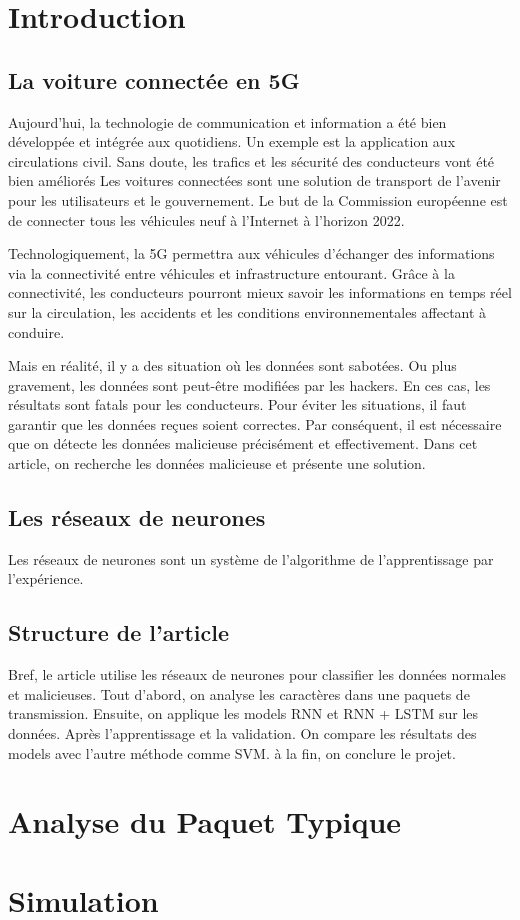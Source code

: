 \documentclass[a4paper]{report}
\begin{document}
\chapter{Introduction}	
	
\section{La voiture connectée en 5G}
Aujourd'hui, la technologie de communication et information a été bien développée et intégrée aux quotidiens. 
Un exemple est la application aux circulations civil. Sans doute, les trafics et les sécurité des conducteurs vont été bien améliorés
Les voitures connectées sont une solution de transport de l'avenir pour les utilisateurs et le gouvernement.  
Le but de la Commission européenne est de connecter tous les véhicules neuf à l'Internet à l'horizon 2022.


Technologiquement, la 5G permettra aux véhicules d'échanger des informations via la connectivité entre véhicules et infrastructure entourant.  
Grâce à la connectivité, les conducteurs pourront mieux savoir les informations en temps réel sur la circulation, les accidents et les conditions environnementales affectant à conduire. 

Mais en réalité, il y a des situation où les données sont sabotées. 
Ou plus gravement, les données sont peut-être modifiées par les hackers.
En ces cas, les résultats sont fatals pour les conducteurs. 
Pour éviter les situations, il faut garantir que les données reçues soient correctes.
Par conséquent, il est nécessaire que on détecte les données malicieuse précisément et effectivement. 
Dans cet article, on recherche les données malicieuse et présente une solution. 

\section{Les réseaux de neurones}
Les réseaux de neurones sont un système de l'algorithme de l'apprentissage par l'expérience.  

\section{Structure de l'article}
Bref, le article utilise les réseaux de neurones pour classifier les données normales et malicieuses.
Tout d'abord, on analyse les caractères dans une paquets de transmission.
Ensuite, on applique les models RNN et RNN + LSTM sur les données. 
Après l'apprentissage et la validation. On compare les résultats des models avec l'autre méthode comme SVM. 
à la fin, on conclure le projet.  

\chapter{Analyse du Paquet Typique}

\chapter{Simulation}







\listoffigures
\begingroup
\let\clearpage\relax
\listoftables
\endgroup
\end{document}
